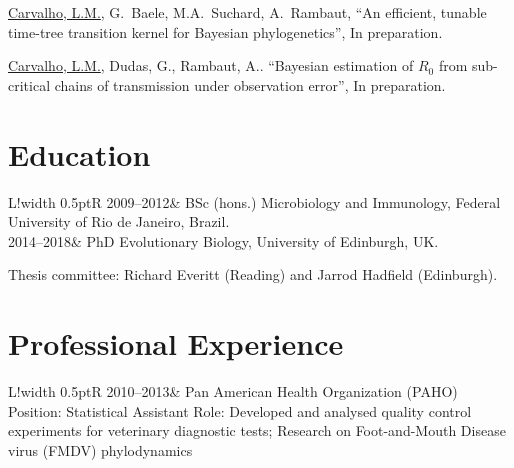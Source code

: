 \documentclass[10pt]{article}
\newcommand\VRule{\color{lightgray}\vrule width 0.5pt}
\begin{document}

\underline{Carvalho, L.M.}, G.~Baele, M.A.~Suchard, A.~Rambaut, ``{A}n efficient, tunable time-tree transition kernel for Bayesian phylogenetics'', In preparation.

\underline{Carvalho, L.M.}, Dudas, G., Rambaut, A..  ``Bayesian estimation of $R_0$ from sub-critical chains of transmission under observation error'', In preparation.

\section*{Education}
\begin{tabular}{L!{\VRule}R}
2009--2012& BSc (hons.) Microbiology and Immunology, Federal University of Rio de Janeiro, Brazil.\\
2014--2018& PhD Evolutionary Biology, University of Edinburgh, UK.

Thesis committee: Richard Everitt (Reading) and Jarrod Hadfield (Edinburgh).
\end{tabular}

\section*{Professional Experience}
\begin{tabular}{L!{\VRule}R}
2010--2013&{
Pan American Health Organization (PAHO)\newline
Position: Statistical Assistant\newline
Role: Developed and analysed quality control experiments for veterinary diagnostic tests;\newline
Research on Foot-and-Mouth Disease virus (FMDV) phylodynamics 
}
\end{tabular}
\end{document}
